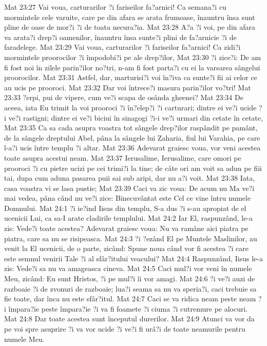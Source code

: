 Mat 23:27  Vai voua, carturarilor ?i fariseilor fa?arnici! Ca semana?i cu mormintele cele varuite, care pe din afara se arata frumoase, înauntru însa sunt pline de oase de mor?i ?i de toata necura?ia.
Mat 23:28  A?a ?i voi, pe din afara va arata?i drep?i oamenilor, înauntru însa sunte?i plini de fa?arnicie ?i de faradelege.
Mat 23:29  Vai voua, carturarilor ?i fariseilor fa?arnici! Ca zidi?i mormintele proorocilor ?i împodobi?i pe ale drep?ilor,
Mat 23:30  ?i zice?i: De am fi fost noi în zilele parin?ilor no?tri, n-am fi fost parta?i cu ei la varsarea sângelui proorocilor.
Mat 23:31  Astfel, dar, marturisi?i voi în?iva ca sunte?i fii ai celor ce au ucis pe prooroci.
Mat 23:32  Dar voi întrece?i masura parin?ilor vo?tri!
Mat 23:33  ?erpi, pui de vipere, cum ve?i scapa de osânda gheenei?
Mat 23:34  De aceea, iata Eu trimit la voi prooroci ?i în?elep?i ?i carturari; dintre ei ve?i ucide ?i ve?i rastigni; dintre ei ve?i biciui în sinagogi ?i-i ve?i urmari din cetate în cetate,
Mat 23:35  Ca sa cada asupra voastra tot sângele drep?ilor raspândit pe pamânt, de la sângele dreptului Abel, pâna la sângele lui Zaharia, fiul lui Varahia, pe care l-a?i ucis între templu ?i altar.
Mat 23:36  Adevarat graiesc voua, vor veni acestea toate asupra acestui neam.
Mat 23:37  Ierusalime, Ierusalime, care omori pe prooroci ?i cu pietre ucizi pe cei trimi?i la tine; de câte ori am voit sa adun pe fiii tai, dupa cum aduna pasarea puii sai sub aripi, dar nu a?i voit.
Mat 23:38  Iata, casa voastra vi se lasa pustie;
Mat 23:39  Caci va zic voua: De acum nu Ma ve?i mai vedea, pâna când nu ve?i zice: Binecuvântat este Cel ce vine întru numele Domnului.
Mat 24:1  ?i ie?ind Iisus din templu, S-a dus ?i s-au apropiat de el ucenicii Lui, ca sa-I arate cladirile templului.
Mat 24:2  Iar El, raspunzând, le-a zis: Vede?i toate acestea? Adevarat graiesc voua: Nu va ramâne aici piatra pe piatra, care sa nu se risipeasca.
Mat 24:3  ?i ?ezând El pe Muntele Maslinilor, au venit la El ucenicii, de o parte, zicând: Spune noua când vor fi acestea ?i care este semnul venirii Tale ?i al sfâr?itului veacului?
Mat 24:4  Raspunzând, Iisus le-a zis: Vede?i sa nu va amageasca cineva.
Mat 24:5  Caci mul?i vor veni în numele Meu, zicând: Eu sunt Hristos, ?i pe mul?i îi vor amagi.
Mat 24:6  ?i ve?i auzi de razboaie ?i de zvonuri de razboaie; lua?i seama sa nu va speria?i, caci trebuie sa fie toate, dar înca nu este sfâr?itul.
Mat 24:7  Caci se va ridica neam peste neam ?i împara?ie peste împara?ie ?i va fi foamete ?i ciuma ?i cutremure pe alocuri.
Mat 24:8  Dar toate acestea sunt începutul durerilor.
Mat 24:9  Atunci va vor da pe voi spre asuprire ?i va vor ucide ?i ve?i fi urâ?i de toate neamurile pentru numele Meu.
